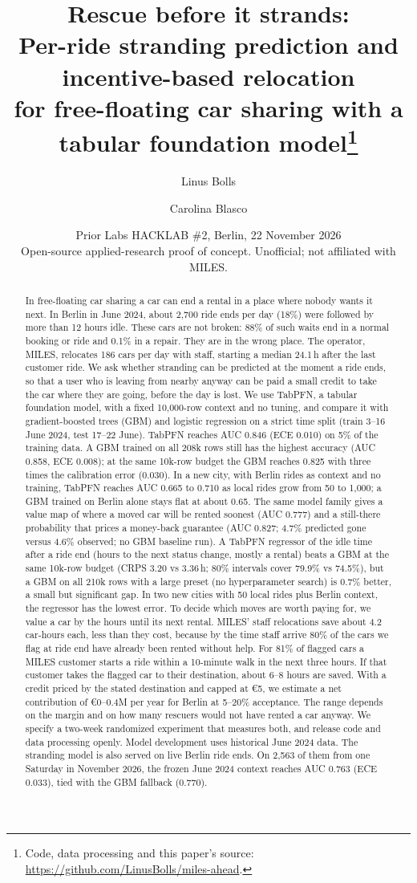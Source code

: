 \documentclass[11pt,a4paper]{article}
\title{\textbf{Rescue before it strands:}\\[2pt]
Per-ride stranding prediction and incentive-based relocation\\
for free-floating car sharing with a tabular foundation model\thanks{Code, data processing and this paper's source: \url{https://github.com/LinusBolls/miles-ahead}.}}
\author{Linus Bolls \and Carolina Blasco}
\date{Prior Labs HACKLAB \#2, Berlin, 22 November 2026\\[4pt]
\small Open-source applied-research proof of concept. Unofficial; not affiliated with MILES.}
\newcommand{\eur}[1]{\euro{}#1}
\begin{document}
\maketitle

\begin{abstract}
\noindent In free-floating car sharing a car can end a rental in a place where nobody wants it next. In Berlin in June 2024, about 2,700 ride ends per day (18\%) were followed by more than 12 hours idle. These cars are not broken: 88\% of such waits end in a normal booking or ride and 0.1\% in a repair. They are in the wrong place. The operator, MILES, relocates 186 cars per day with staff, starting a median 24.1\,h after the last customer ride. We ask whether stranding can be predicted at the moment a ride ends, so that a user who is leaving from nearby anyway can be paid a small credit to take the car where they are going, before the day is lost. We use TabPFN, a tabular foundation model, with a fixed 10,000-row context and no tuning, and compare it with gradient-boosted trees (GBM) and logistic regression on a strict time split (train 3--16 June 2024, test 17--22 June). TabPFN reaches AUC 0.846 (ECE 0.010) on 5\% of the training data. A GBM trained on all 208k rows still has the highest accuracy (AUC 0.858, ECE 0.008); at the same 10k-row budget the GBM reaches 0.825 with three times the calibration error (0.030). In a new city, with Berlin rides as context and no training, TabPFN reaches AUC 0.665 to 0.710 as local rides grow from 50 to 1,000; a GBM trained on Berlin alone stays flat at about 0.65. The same model family gives a value map of where a moved car will be rented soonest (AUC 0.777) and a still-there probability that prices a money-back guarantee (AUC 0.827; 4.7\% predicted gone versus 4.6\% observed; no GBM baseline run). A TabPFN regressor of the idle time after a ride end (hours to the next status change, mostly a rental) beats a GBM at the same 10k-row budget (CRPS 3.20 vs 3.36\,h; 80\% intervals cover 79.9\% vs 74.5\%), but a GBM on all 210k rows with a large preset (no hyperparameter search) is 0.7\% better, a small but significant gap. In two new cities with 50 local rides plus Berlin context, the regressor has the lowest error. To decide which moves are worth paying for, we value a car by the hours until its next rental. MILES' staff relocations save about 4.2 car-hours each, less than they cost, because by the time staff arrive 80\% of the cars we flag at ride end have already been rented without help. For 81\% of flagged cars a MILES customer starts a ride within a 10-minute walk in the next three hours. If that customer takes the flagged car to their destination, about 6--8 hours are saved. With a credit priced by the stated destination and capped at \eur{5}, we estimate a net contribution of \eur{0}--0.4M per year for Berlin at 5--20\% acceptance. The range depends on the margin and on how many rescuers would not have rented a car anyway. We specify a two-week randomized experiment that measures both, and release code and data processing openly. Model development uses historical June 2024 data. The stranding model is also served on live Berlin ride ends. On 2,563 of them from one Saturday in November 2026, the frozen June 2024 context reaches AUC 0.763 (ECE 0.033), tied with the GBM fallback (0.770).

\end{abstract}
\end{document}
